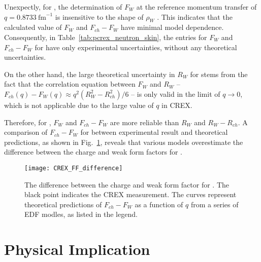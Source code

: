 Unexpectly, for \Ca, the determination of $F_W$ at the reference momentum transfer
of $q = 0.8733\ \text{fm}^{-1}$ is insensitive to the shape of $\rho_W$ \cite{PhysRevLett.129.042501}. 
This indicates that the calculated value of $F_W$ and $F_{ch} - F_W$ have minimal
model dependence. Consequently, in Table~\ref{tab:pcrex_neutron_skin}, 
the entries for $F_W$ and $F_{ch} - F_W$ for \Ca have only experimental uncertainties, 
without any theoretical uncertainties.

On the other hand, the large theoretical uncertainty in $R_W$ for \Ca stems 
from the fact that the correlation equation between $F_W$ and $R_W$ -- 
$F_{ch}(q) - F_W(q) \approx q^2 (R^2_{W} - R^2_{ch})/6$ -- is only valid in
the limit of $q \rightarrow 0$, which is not applicable due to the large value of $q$ in CREX.

Therefore, for \Ca, $F_W$ and $F_{ch} - F_{W}$ are more reliable than $R_W$ and $R_W - R_{ch}$.
A comparison of $F_{ch} - F_W$ for \Ca between experimental result and theoretical predictions,
as shown in Fig.~\ref{fig:CREX_FF_difference}, 
reveals that various models overestimate the difference between the charge
and weak form factors for \Ca.

\begin{figure}[!h]
    \centering
    \texttt{[image: CREX\_FF\_difference]}
    \caption[The difference between the charge and weak FFs for \Ca.]
    { The difference between the charge and weak form factor for \Ca. The black
    point indicates the CREX measurement. The curves represent theoretical 
    predictions of $F_{ch} - F_W$ as a function of $q$ from a series of EDF modles,
    as listed in the legend.
    }
    \label{fig:CREX_FF_difference}
\end{figure}


\section{Physical Implication}
\begin{comment}
    \begin{itemize}
	\item The \Pb radius constrains the pressure of neutron matter at subnuclear densities
	\item The NS radius depends on the pressure at nuclear density and above
	\item Large \Pb radius ==> EOS at low density is stiff with high pressure.
	\item Small NS radius means high density EOS soft
	\item This softening of EOS with density could strong suggest a transition 
	    to an exotic high density phase such as quark matter, strange matter,
	    color superconductor, kaon condensate...
	\item Thin skin in \Pb ==> low transition density in star
    \end{itemize}
\end{comment}

